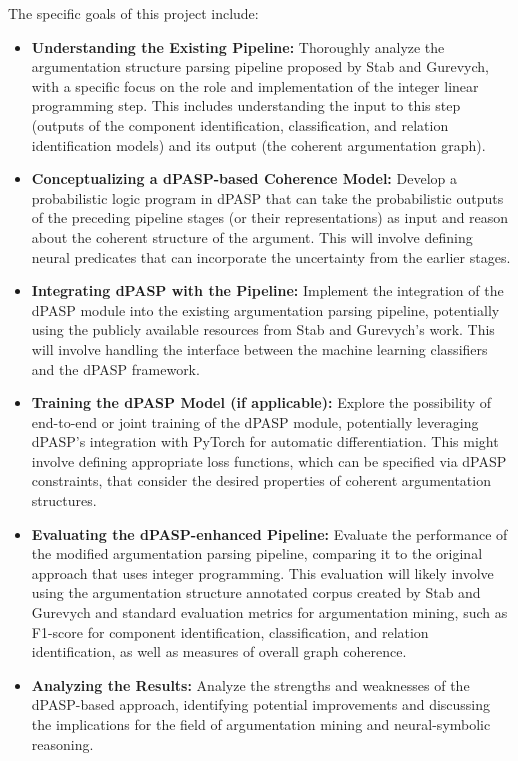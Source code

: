 \documentclass{article}
\begin{document}
The specific goals of this project include:

\begin{itemize}
    \item \textbf{Understanding the Existing Pipeline:} Thoroughly analyze the
    argumentation structure parsing pipeline proposed by Stab and Gurevych, with
    a specific focus on the role and implementation of the integer linear
    programming step. This includes understanding the input to this step
    (outputs of the component identification, classification, and relation
    identification models) and its output (the coherent argumentation graph).

    \item \textbf{Conceptualizing a dPASP-based Coherence Model:} Develop a
    probabilistic logic program in dPASP that can take the probabilistic outputs
    of the preceding pipeline stages (or their representations) as input and
    reason about the coherent structure of the argument. This will involve
    defining neural predicates that can incorporate the uncertainty from the
    earlier stages.

    \item \textbf{Integrating dPASP with the Pipeline:} Implement the
    integration of the dPASP module into the existing argumentation parsing
    pipeline, potentially using the publicly available resources from Stab and
    Gurevych's work. This will involve handling the interface between the
    machine learning classifiers and the dPASP framework.

    \item \textbf{Training the dPASP Model (if applicable):} Explore the
    possibility of end-to-end or joint training of the dPASP module, potentially
    leveraging dPASP's integration with PyTorch for automatic differentiation.
    This might involve defining appropriate loss functions, which can be
    specified via dPASP constraints, that consider the desired properties of
    coherent argumentation structures.

    \item \textbf{Evaluating the dPASP-enhanced Pipeline:} Evaluate the
    performance of the modified argumentation parsing pipeline, comparing it to
    the original approach that uses integer programming. This evaluation will
    likely involve using the argumentation structure annotated corpus created
    by Stab and Gurevych and standard evaluation metrics for argumentation
    mining, such as F1-score for component identification, classification, and
    relation identification, as well as measures of overall graph coherence.

    \item \textbf{Analyzing the Results:} Analyze the strengths and weaknesses
    of the dPASP-based approach, identifying potential improvements and
    discussing the implications for the field of argumentation mining and
    neural-symbolic reasoning.
\end{itemize}
\end{document}
